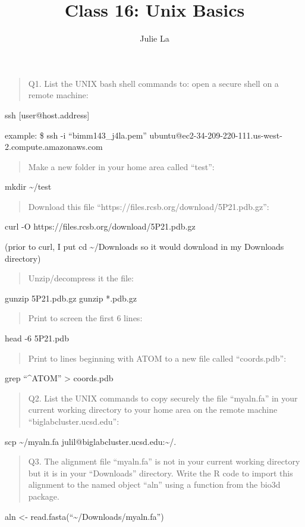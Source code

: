 \documentclass[
  letterpaper,
  DIV=11,
  numbers=noendperiod]{scrartcl}
\title{Class 16: Unix Basics}
\author{Julie La}
\date{}
\begin{document}
\maketitle


\begin{quote}
Q1. List the UNIX bash shell commands to: open a secure shell on a
remote machine:
\end{quote}

ssh {[}user@host.address{]}

example: \$ ssh -i ``bimm143\_j4la.pem''
ubuntu@ec2-34-209-220-111.us-west-2.compute.amazonaws.com

\begin{quote}
Make a new folder in your home area called ``test'':
\end{quote}

mkdir \textasciitilde/test

\begin{quote}
Download this file ``https://files.rcsb.org/download/5P21.pdb.gz'':
\end{quote}

curl -O https://files.rcsb.org/download/5P21.pdb.gz

(prior to curl, I put cd \textasciitilde/Downloads so it would download
in my Downloads directory)

\begin{quote}
Unzip/decompress it the file:
\end{quote}

gunzip 5P21.pdb.gz gunzip *.pdb.gz

\begin{quote}
Print to screen the first 6 lines:
\end{quote}

head -6 5P21.pdb

\begin{quote}
Print to lines beginning with ATOM to a new file called ``coords.pdb'':
\end{quote}

grep ``\^{}ATOM'' \textgreater{} coords.pdb

\begin{quote}
Q2. List the UNIX commands to copy securely the file ``myaln.fa'' in
your current working directory to your home area on the remote machine
``biglabcluster.ucsd.edu'':
\end{quote}

scp \textasciitilde/myaln.fa
julil@biglabcluster.ucsd.edu:\textasciitilde/.

\begin{quote}
Q3. The alignment file ``myaln.fa'' is not in your current working
directory but it is in your ``Downloads'' directory. Write the R code to
import this alignment to the named object ``aln'' using a function from
the bio3d package.
\end{quote}

aln \textless- read.fasta(``\textasciitilde/Downloads/myaln.fa'')
\end{document}
